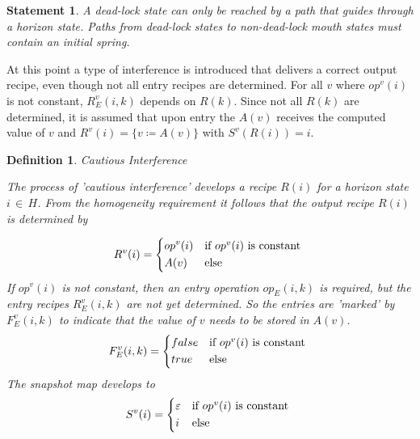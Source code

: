 \documentclass[12pt,a4paper]{scrartcl}
\newtheorem{definition}{Definition}
\newtheorem{statement}{Statement}
\begin{document}
\begin{statement} \label{stm:dead-lock-horizon}
A dead-lock state can only be reached by a path that guides through a horizon
state.  Paths from dead-lock states to non-dead-lock mouth states must contain
an initial spring.  
\end{statement}

At this point a type of interference is introduced that delivers a correct
output recipe, even though not all entry recipes are determined. For all $v$ where 
$op^v(i)$ is not constant, $R^v_E(i,k)$ depends on $R(k)$. Since not all 
$R(k)$ are determined, it is assumed that upon entry the $A(v)$ receives the
computed value of $v$ and $R^v(i) = \{ v \coloneqq  A(v) \}$ with $S^v(R(i))=i$.

\begin{definition}
Cautious Interference

The process of 'cautious interference' develops a recipe $R(i)$ for a horizon state
$i\,\in\,H$.  From the homogeneity requirement it follows that the output
recipe $R(i)$ is determined by 
          
\begin{equation} \label{eq:cautious-output-recipe}
    R^v(i) = \begin{dcases*}
              op^v(i) & if $op^v(i)$ is constant \\
              A(v)    & else
             \end{dcases*}
\end{equation}
If $op^v(i)$ is not constant, then an entry operation $op_E(i,k)$ is required,
but the entry recipes $R_E^v(i,k)$ are not yet determined. So the entries are
'marked' by $F_E^v(i,k)$ to indicate that the value of $v$ needs to be
stored in $A(v)$.
\begin{equation}
    F_E^v(i,k) = \begin{dcases*}
                     false & if $op^v(i)$ is constant \\
                     true  & else
                 \end{dcases*}
\end{equation}
The snapshot map develops to
\begin{equation} \label{eq:cautious-interference-snapshot}
    S^v(i) = \begin{dcases*}
                \varepsilon & if $op^v(i)$ is constant \\
                i           & else
             \end{dcases*}
\end{equation}
\end{definition}
\end{document}
